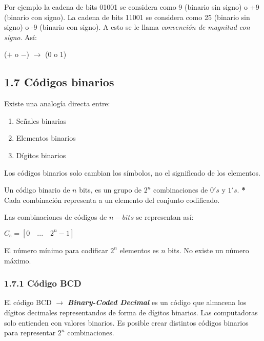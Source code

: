 Por ejemplo la cadena de bits 01001 se considera como 9 (binario sin signo) o
+9 (binario con signo). La cadena de bits 11001 se considera como 25 (binario
sin signo) o -9 (binario con signo). A esto se le llama \textit{convenci\'{o}n
de magnitud con signo}. As\'{i}:
\begin{center}
    ($+$ o $-$) $\rightarrow$ (0 o 1)
\end{center}

\subsection*{1.7 C\'{o}digos binarios}
Existe una analog\'{i}a directa entre:
\begin{enumerate}
    \small
    \item Se\~{n}ales binarias
    \item Elementos binarios
    \item D\'{i}gitos binarios
\end{enumerate}

Los c\'{o}digos binarios solo cambian los s\'{i}mbolos, no el significado de
los elementos.
\begin{center}
    Un c\'{o}digo binario de $n$ bits, es un grupo de $2^n$ combinaciones de $0's$ y $1's$.
    \textbf{*} Cada combinaci\'{o}n representa  a un elemento del conjunto codificado.
\end{center}

Las combinaciones de c\'{o}digos de $n-bits$ se representan as\'{i}:
\begin{center}
    $ C_{e} = [0 \quad ... \quad 2^n - 1]$
\end{center}

El n\'{u}mero m\'{i}nimo para codificar $2^n$ elementos es $n$ bits. No existe
un n\'{u}mero m\'{a}ximo.

\subsubsection*{1.7.1 C\'{o}digo BCD} El c\'{o}digo BCD $\rightarrow$
\textbf{\textit{Binary-Coded Decimal}} es un c\'{o}digo que almacena los
d\'{i}gitos decimales representandos de forma de d\'{i}gitos binarios. Las
computadoras solo entienden con valores binarios. Es posible crear distintos
c\'{o}digos binarios para representar $2^n$ combinaciones.

